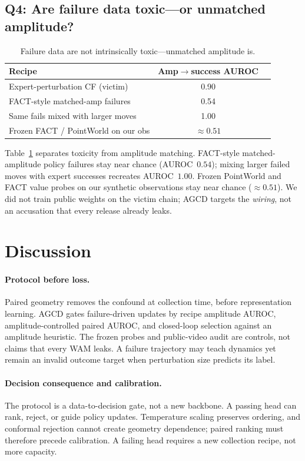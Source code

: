 \documentclass[conference]{IEEEtran}
\begin{document}
\subsection{Q4: Are failure data toxic---or unmatched amplitude?}
\label{sec:q4}

\begin{table}[t]
\centering
\caption{Failure data are not intrinsically toxic---unmatched amplitude is.}
\label{tab:fact}
\begin{tabular}{lcc}
\toprule
\rowcolor{hdr}
Recipe & Amp$\rightarrow$success AUROC \\
\midrule
Expert-perturbation CF (victim) & 0.90 \\
FACT-style matched-amp failures & 0.54 \\
Same fails mixed with larger moves & 1.00 \\
Frozen FACT / PointWorld on our obs & $\approx 0.51$ \\
\bottomrule
\end{tabular}
\end{table}

Table~\ref{tab:fact} separates toxicity from amplitude matching. FACT-style
matched-amplitude policy failures stay near chance (AUROC~$0.54$); mixing larger
failed moves with expert successes recreates AUROC~$1.00$. Frozen PointWorld
and FACT value probes on our synthetic observations stay near chance
($\approx 0.51$). We did not train public weights on the victim chain; AGCD
targets the \emph{wiring}, not an accusation that every release already leaks.

\section{Discussion}
\label{sec:disc}

\paragraph{Protocol before loss.}
Paired geometry removes the confound at collection time, before representation
learning. AGCD gates failure-driven updates by recipe amplitude AUROC,
amplitude-controlled paired AUROC, and closed-loop selection against an
amplitude heuristic. The frozen probes and public-video audit are controls, not
claims that every WAM leaks. A failure trajectory may teach dynamics yet remain
an invalid outcome target when perturbation size predicts its label.

\paragraph{Decision consequence and calibration.}
The protocol is a data-to-decision gate, not a new backbone. A passing head can
rank, reject, or guide policy updates. Temperature scaling preserves ordering,
and conformal rejection cannot create geometry dependence; paired ranking must
therefore precede calibration. A failing head requires a new collection recipe,
not more capacity.
\end{document}
